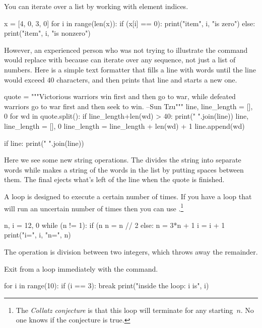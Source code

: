 You can iterate over a list by working with element indices.
\begin{pythonconsole}
x = [4, 0, 3, 0]
for i in range(len(x)):
    if (x[i] == 0):
        print("item", i, "is zero")
    else:
        print("item", i, "is nonzero")

\end{pythonconsole}
However, an experienced  \python{} person who was not trying to illustrate 
the  command
would replace 
with  because
 can iterate over any sequence, not just
a list of numbers.
Here is a simple text formatter that fills a line with words until
the line would exceed $40$ characters, and then
prints that line and starts a new one.
\begin{pythonconsole}
quote = """Victorious warriors win first and then go to war, 
while defeated warriors go to war first and then seek to win. 
--Sun Tzu"""
line, line_length = [], 0
for wd in quote.split():
    if line_length+len(wd) > 40:
        print(" ".join(line))
        line, line_length = [], 0
    line_length = line_length + len(wd) + 1
    line.append(wd)

if line:
    print(" ".join(line))

\end{pythonconsole}
Here we see some new string operations.
The  divides the string into separate words while
 makes a string of the words in the list 
 by putting spaces between them.
The final  ejects what's left of the line
when the quote is finished.

A  loop is designed to execute a certain
number of times.
If you have a loop that will run an uncertain number of times then
you can use .\footnote{The 
\protect\textit{Collatz conjecture} is 
that this loop will 
terminate for any starting~$n$.
No one knows if the conjecture is true.}
\begin{pythonconsole}
n, i = 12, 0
while (n != 1):
    if (n %
        n = n // 2
    else:
        n = 3*n + 1
    i = i + 1
    print("i=", i, "n=", n)

\end{pythonconsole}
The \inlinecode{//} operation is division between two integers, which
throws away the remainder.

Exit from a loop immediately with the  command.
\begin{pythonconsole}
for i in range(10):
    if (i == 3):
        break
    print("inside the loop: i is", i)

\end{pythonconsole}

